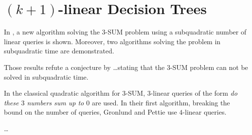 \section{$(k+1)$-linear Decision Trees}

In \cite{gronlund:2014}, a new algorithm solving the $3$-SUM problem using a
subquadratic number of linear queries is shown. Moreover, two algorithms
solving the problem in subquadratic time are demonstrated.

Those results refute a conjecture by \dots stating that the $3$-SUM problem can
not be solved in subquadratic time.

In the classical quadratic algorithm for $3$-SUM, $3$-linear queries of the
form \emph{do these $3$ numbers sum up to $0$} are used. In their first
algorithm, breaking the  bound on the number of queries, Gronlund
and Pettie use $4$-linear queries.

\dots
